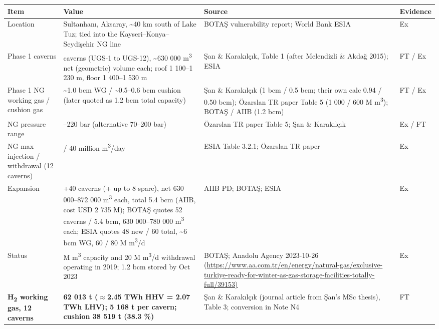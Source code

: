 \documentclass[11pt,a4paper]{article}
\begin{document}
\begin{center}\scriptsize
\begin{tabularx}{\textwidth}{>{\hsize=0.492\hsize\raggedright\arraybackslash}X>{\hsize=1.513\hsize\raggedright\arraybackslash}X>{\hsize=0.996\hsize\raggedright\arraybackslash}Xl}
\toprule
\textbf{Item} & \textbf{Value} & \textbf{Source} & \textbf{Evidence} \\
\midrule
Location & Sultanhanı, Aksaray, \textasciitilde{}40 km south of Lake Tuz; tied into the Kayseri--Konya--Seydişehir NG line & BOTAŞ vulnerability report; World Bank ESIA & Ex \\
Phase 1 caverns & 12 caverns (UGS-1 to UGS-12), \textasciitilde{}630 000 m\textsuperscript{3} net (geometric) volume each; roof 1 100--1 230 m, floor 1 400--1 530 m & Şan \& Karakılçık, Table 1 (after Melendizli \& Akdağ 2015); ESIA & FT /\allowbreak{} Ex \\
Phase 1 NG working gas /\allowbreak{} cushion gas & \textasciitilde{}1.0 bcm WG /\allowbreak{} \textasciitilde{}0.5--0.6 bcm cushion (later quoted as 1.2 bcm total capacity) & Şan \& Karakılçık (1 bcm /\allowbreak{} 0.5 bcm; their own calc 0.94 /\allowbreak{} 0.50 bcm); Özarslan TR paper Table 5 (1 000 /\allowbreak{} 600 M m\textsuperscript{3}); BOTAŞ /\allowbreak{} AIIB (1.2 bcm) & FT /\allowbreak{} Ex \\
NG pressure range & 80--220 bar (alternative 70--200 bar) & Özarslan TR paper Table 5; Şan \& Karakılçık & Ex /\allowbreak{} FT \\
NG max injection /\allowbreak{} withdrawal (12 caverns) & 30 /\allowbreak{} 40 million m\textsuperscript{3}/\allowbreak{}day & ESIA Table 3.2.1; Özarslan TR paper & Ex \\
Expansion & +40 caverns (+ up to 8 spare), net 630 000--872 000 m\textsuperscript{3} each, total 5.4 bcm (AIIB, cost USD 2 735 M); BOTAŞ quotes 52 caverns /\allowbreak{} 5.4 bcm, 630 000--780 000 m\textsuperscript{3} each; ESIA quotes 48 new /\allowbreak{} 60 total, \textasciitilde{}6 bcm WG, 60 /\allowbreak{} 80 M m\textsuperscript{3}/\allowbreak{}d & AIIB PD; BOTAŞ; ESIA & Ex \\
Status & 680 M m\textsuperscript{3} capacity and 20 M m\textsuperscript{3}/\allowbreak{}d withdrawal operating in 2019; 1.2 bcm stored by Oct 2023 & BOTAŞ; Anadolu Agency 2023-10-26 (\url{https://www.aa.com.tr/en/energy/natural-gas/exclusive-turkiye-ready-for-winter-as-gas-storage-facilities-totally-full/39153)} & Ex \\
\textbf{H\textsubscript{2} working gas, 12 caverns} & \textbf{62 013 t ($\approx$2.45 TWh HHV = 2.07 TWh LHV); 5 168 t per cavern; cushion 38 519 t (38.3 \%)} & Şan \& Karakılçık (journal article from Şan's MSc thesis), Table 3; conversion in Note N4 & FT \\

\end{tabularx}
\end{center}
\end{document}
